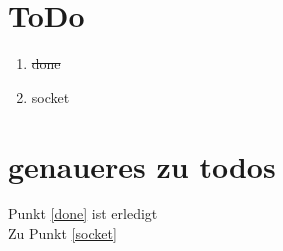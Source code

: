 \documentclass [10pt,a4paper]{article}
\begin{document}
\section{ToDo}
	\begin{enumerate}
		\item\label{done} \sout{done}
		\item\label{socket} socket
	\end{enumerate}
\section{genaueres zu todos}
	Punkt \ref{done} ist erledigt\\[1ex]
	Zu Punkt \ref{socket}
	
	
\end{document}
